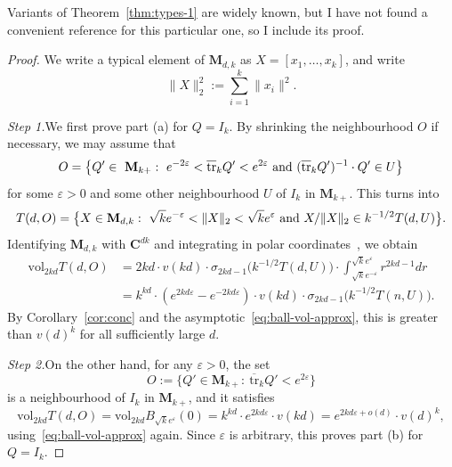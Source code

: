 \documentclass[12pt,a4paper]{article}
\numberwithin{equation}{section}
\theoremstyle{remark}
\newcommand{\bbC}{\mathbf{C}}
\newcommand{\rmM}{\mathbf{M}}
\newcommand{\eps}{\varepsilon}
\newcommand{\s}{\sigma}
\newcommand{\vol}{\mathrm{vol}}
\newcommand{\tr}{\overline{\mathrm{tr}}}
\begin{document}
Variants of Theorem~\ref{thm:types-1} are widely known, but I have not found a convenient reference for this particular one, so I include its proof.

\begin{proof}
We write a typical element of $\rmM_{d,k}$ as $X = [x_1,\dots,x_k]$, and write
\[\|X\|_2^2 := \sum_{i=1}^k \|x_i\|^2.\]

\vspace{7pt}

\emph{Step 1.}\quad We first prove part (a) for $Q = I_k$.  By shrinking the neighbourhood $O$ if necessary, we may assume that
\[O = \big\{Q' \in\ \rmM_{k+}:\ e^{-2\eps} < \tr_k Q' < e^{2\eps}\ \hbox{and}\ (\tr_k Q')^{-1}\cdot Q' \in U\big\}\]
for some $\eps > 0$ and some other neighbourhood $U$ of $I_k$ in $\rmM_{k+}$.  This turns into
\[T(d,O) = \big\{X \in \rmM_{d,k}:\ \sqrt{k}e^{-\eps} < \|X\|_2 < \sqrt{k}e^\eps\ \hbox{and}\ X/\|X\|_2 \in k^{-1/2}T(d,U)\big\}.\]
Identifying $\rmM_{d,k}$ with $\bbC^{dk}$ and integrating in polar coordinates~\cite[Subsec. 1.4.3]{RudinFTUB}, we obtain
\begin{align}\label{eq:use-of-polar-1}
\vol_{2kd}T(d,O) &= 2kd\cdot v(kd)\cdot \s_{2kd-1}\big(k^{-1/2}T(d,U)\big)\cdot \int_{\sqrt{k}e^{-\eps}}^{\sqrt{k}e^\eps}r^{2kd-1} dr\\
&= k^{kd}\cdot (e^{2kd\eps} - e^{-2kd\eps})\cdot v(kd)\cdot \s_{2kd-1}\big(k^{-1/2}T(n,U)\big) \nonumber.
\end{align}
By Corollary~\ref{cor:conc} and the asymptotic~\eqref{eq:ball-vol-approx}, this is greater than $v(d)^k$ for all sufficiently large $d$.

\vspace{7pt}

\emph{Step 2.}\quad On the other hand, for any $\eps > 0$, the set
\[O := \{Q' \in \rmM_{k+}:\ \tr_k Q' < e^{2\eps}\}\]
is a neighbourhood of $I_k$ in $\rmM_{k+}$, and it satisfies
\[\vol_{2kd}T(d,O) = \vol_{2kd} B_{\sqrt{k}e^\eps}(0) = k^{kd}\cdot e^{2kd\eps}\cdot v(kd) = e^{2kd\eps + o(d)}\cdot v(d)^k,\]
using~\eqref{eq:ball-vol-approx} again. Since $\eps$ is arbitrary, this proves part (b) for $Q = I_k$.

\vspace{7pt}


\end{proof}
\end{document}
